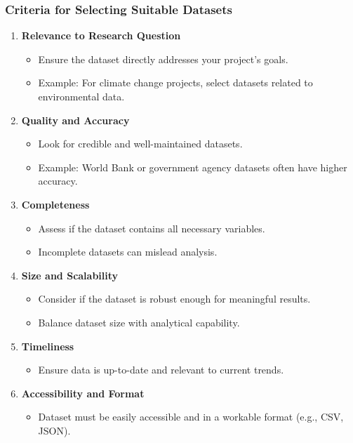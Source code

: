 \documentclass[aspectratio=169]{beamer}
\begin{document}
\begin{frame}[fragile]
    \frametitle{Criteria for Selecting Suitable Datasets}
    \begin{enumerate}
        \item \textbf{Relevance to Research Question}
        \begin{itemize}
            \item Ensure the dataset directly addresses your project’s goals.
            \item Example: For climate change projects, select datasets related to environmental data.
        \end{itemize}
        
        \item \textbf{Quality and Accuracy}
        \begin{itemize}
            \item Look for credible and well-maintained datasets.
            \item Example: World Bank or government agency datasets often have higher accuracy.
        \end{itemize}

        \item \textbf{Completeness}
        \begin{itemize}
            \item Assess if the dataset contains all necessary variables.
            \item Incomplete datasets can mislead analysis.
        \end{itemize}

        \item \textbf{Size and Scalability}
        \begin{itemize}
            \item Consider if the dataset is robust enough for meaningful results.
            \item Balance dataset size with analytical capability.
        \end{itemize}
        
        \item \textbf{Timeliness}
        \begin{itemize}
            \item Ensure data is up-to-date and relevant to current trends.
        \end{itemize}

        \item \textbf{Accessibility and Format}
        \begin{itemize}
            \item Dataset must be easily accessible and in a workable format (e.g., CSV, JSON).
        \end{itemize}
    \end{enumerate}
\end{frame}
\end{document}
